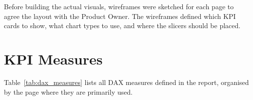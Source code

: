 \documentclass[12pt, a4paper]{report}
\begin{document}
Before building the actual visuals, wireframes were sketched for each page to agree
the layout with the Product Owner. The wireframes defined which KPI cards to show,
what chart types to use, and where the slicers should be placed.





\section{KPI Measures}

Table~\ref{tab:dax_measures} lists all DAX measures defined in the report, organised
by the page where they are primarily used.
\end{document}
